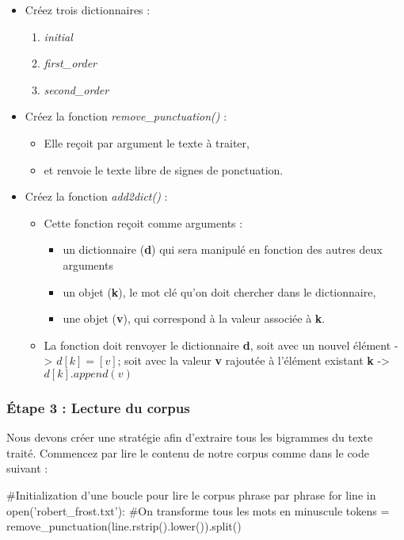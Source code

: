 \begin{itemize}
	\item Créez trois dictionnaires :
	\begin{enumerate}
		\item \textit{initial}
		\item \textit{first\_order}
		\item \textit{second\_order}
	\end{enumerate}
	\item Créez la fonction \textit{remove\_punctuation()} : 
	\begin{itemize}
		\item Elle reçoit par argument le texte à traiter,
		\item et renvoie le texte libre de signes de ponctuation.
	\end{itemize}
	\item Créez la fonction \textit{add2dict()} :
	\begin{itemize}
		\item Cette fonction reçoit comme arguments : 
		\begin{itemize}
			\item un dictionnaire (\textbf{d}) qui sera manipulé en fonction des autres deux arguments
			\item un objet (\textbf{k}), le mot clé qu'on doit chercher dans le dictionnaire,
			\item une objet (\textbf{v}), qui correspond à la valeur associée à \textbf{k}.
		\end{itemize}
		\item La fonction doit renvoyer le dictionnaire \textbf{d}, soit avec un nouvel élément -> $d[k] = [v]$; soit avec la valeur \textbf{v} rajoutée à l'élément existant \textbf{k} -> $d[k].append(v)$
	
	\end{itemize}
\end{itemize}



\subsubsection{Étape 3 : Lecture du corpus}

Nous devons créer une stratégie afin d'extraire tous les bigrammes du texte traité. Commencez par lire le contenu de notre corpus comme dans le code suivant :

\begin{python}
#Initialization d'une boucle pour lire le corpus phrase par phrase
for line in open('robert_frost.txt'):
 #On transforme tous les mots en minuscule
 tokens = remove_punctuation(line.rstrip().lower()).split()
 
\end{python}

